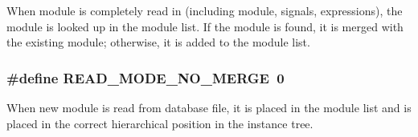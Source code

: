 When module is completely read in (including module, signals, expressions), the module is looked up in the module list. If the module is found, it is merged with the existing module; otherwise, it is added to the module list. 
\subsubsection{\setlength{\rightskip}{0pt plus 5cm}\#define READ\_\-MODE\_\-NO\_\-MERGE\ 0}\label{group__read__modes_a0}


When new module is read from database file, it is placed in the module list and is placed in the correct hierarchical position in the instance tree. 